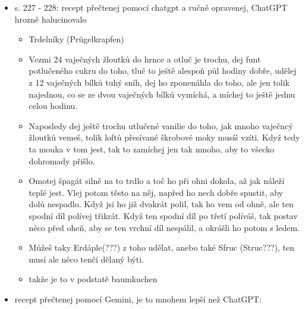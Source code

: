 \begin{itemize}
  \begin{itemize}
  \tightlist
  \item
    s. 227 - 228: recept přečtenej pomocí chatgpt a ručně opravenej,
    ChatGPT hrozně halucinovalo

    \begin{itemize}
    \tightlist
    \item
      Trdelníky (Prügelkrapfen)
    \item
      Vezmi 24 vaječných žloutků do hrnce a otluč je trochu, dej funt
      potlučeného cukru do toho, tluč to ještě alespoň půl hodiny dobře,
      udělej z 12 vaječných bílků tuhý sníh, dej ho zponenáhla do toho,
      ale jen tolik najednou, co se ze dvou vaječných bílků vymíchá, a
      míchej to ještě jednu celou hodinu.
    \item
      Naposledy dej ještě trochu utlučené vanilie do toho, jak mnoho
      vaječncý žloutků vemeš, tolik loftů přesívané škrobové moky musíš
      vzíti. Když tedy ta mouka v tom jest, tak to zamíchej jen tak
      mnoho, aby to všecko dohromady přišlo.
    \item
      Omotej špagát silně na to trdlo a toč ho při ohni dokola, až jak
      náleží teplé jest. Vlej potom těsto na něj, napřed ho nech dobře
      spustit, aby dolů nespadlo. Když jsi ho již dvakrát polil, tak ho
      vem od ohně, ale ten spodní díl polívej třikrát. Když ten spodní
      díl po třetí políváš, tak postav něco před oheň, aby se ten vrchní
      díl nespálil, a okrášli ho potom s ledem.
    \item
      Můžeš taky Erdáple(???) z toho udělat, anebo také Sfruc
      (Struc???), ten musí ale něco tenčí dělaný býti.
    \item
      takže je to v podstatě baumkuchen
    \end{itemize}
  \item
    recept přečtenej pomocí Gemini, je to mnohem lepší než ChatGPT:


\end{itemize}
\end{itemize}
